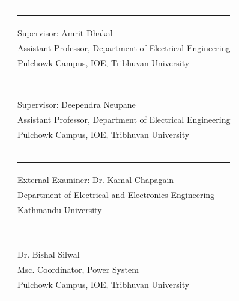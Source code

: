 \documentclass[oneside, 12pt]{book}
\numberwithin{equation}{chapter}
\begin{document}
\bigskip
\hspace{2cm}
\begin{table}[h]
	\begin{tabular}{ll}
	
		\hspace{3cm} & \rule{9.75cm}{1pt} \\
		\hspace{3cm} & Supervisor: Amrit Dhakal\\
		\hspace{2cm} & Assistant Professor, Department of Electrical Engineering \\
		\hspace{3cm} &  Pulchowk Campus, IOE, Tribhuvan University \\
		
		\\
		\\
		
		\hspace{3cm} & \rule{9.75cm}{1pt} \\
		\hspace{3cm} & Supervisor: Deependra Neupane\\
		\hspace{2cm} & Assistant Professor, Department of Electrical Engineering \\
		\hspace{3cm} &  Pulchowk Campus, IOE, Tribhuvan University \\
		
		\\
		\\
		
		
		\hspace{3cm} & \\
		\hspace{3cm} & \rule{9.75cm}{1pt} \\
		\hspace{3cm} & External Examiner: Dr. Kamal Chapagain\\
		\hspace{3cm} & Department of Electrical and Electronics Engineering\\
		\hspace{3cm} & Kathmandu University \\
		\hspace{3cm} & \\
		
		\\
		\\
				
		\hspace{2cm} & \rule{9.75cm}{1pt} \\
		\hspace{2cm} & Dr. Bishal Silwal\\
		\hspace{2cm} & Msc. Coordinator, Power System \\
		\hspace{2cm} & Pulchowk Campus, IOE, Tribhuvan University \\ 
		\hspace{2cm} &  \\
		
	\end{tabular}
\end{table}
\end{document}
